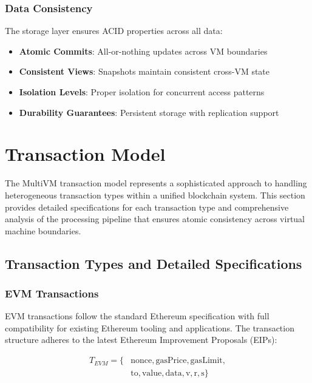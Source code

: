 \documentclass[11pt,a4paper]{article}
\begin{document}
\subsubsection{Data Consistency}
The storage layer ensures ACID properties across all data:
\begin{itemize}
    \item \textbf{Atomic Commits}: All-or-nothing updates across VM boundaries
    \item \textbf{Consistent Views}: Snapshots maintain consistent cross-VM state
    \item \textbf{Isolation Levels}: Proper isolation for concurrent access patterns
    \item \textbf{Durability Guarantees}: Persistent storage with replication support
\end{itemize}

\section{Transaction Model}

The MultiVM transaction model represents a sophisticated approach to handling heterogeneous transaction types within a unified blockchain system. This section provides detailed specifications for each transaction type and comprehensive analysis of the processing pipeline that ensures atomic consistency across virtual machine boundaries.

\subsection{Transaction Types and Detailed Specifications}

\subsubsection{EVM Transactions}
EVM transactions follow the standard Ethereum specification with full compatibility for existing Ethereum tooling and applications. The transaction structure adheres to the latest Ethereum Improvement Proposals (EIPs):

\begin{align}
T_{EVM} = \{&\text{nonce}, \text{gasPrice}, \text{gasLimit}, \\
           &\text{to}, \text{value}, \text{data}, \text{v}, \text{r}, \text{s}\}
\end{align}
\end{document}

